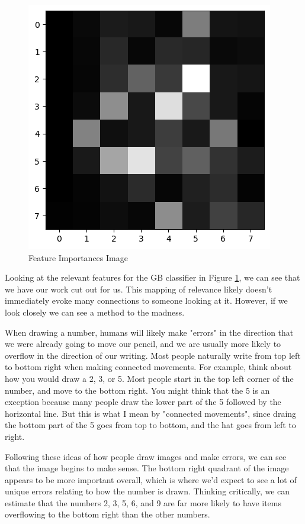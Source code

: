 \documentclass[12pt]{article}
\begin{document}
\begin{figure}
  \includegraphics[width = .75\textwidth]{../results5/Features_Digits.png}
  \caption{Feature Importances Image}
  \label{figure6}
\end{figure}

Looking at the relevant features for the GB classifier in Figure \ref{figure6}, we can see that we have our work cut out 
for us. This mapping of relevance likely doesn't immediately evoke many connections to someone looking at it. However,
if we look closely we can see a method to the madness. 

When drawing a number, humans will likely make "errors" in the direction that we were already going to move our pencil, 
and we are usually more likely to overflow in the direction of our writing. Most people naturally write from top left to 
bottom right when making connected movements. For example, think about how you would draw a 2, 3, or 5. Most people 
start in the top left corner of the number, and move to the bottom right. You might think that the 5 is an exception because 
many people draw the lower part of the 5 followed by the horizontal line. But this is what I mean by "connected movements", 
since draing the bottom part of the 5 goes from top to bottom, and the hat goes from left to right. 

Following these ideas of how people draw images and make errors, we can see that the image begins to make sense. The 
bottom right quadrant of the image appears to be more important overall, which is where we'd expect to see a lot of 
unique errors relating to how the number is drawn. Thinking critically, we can estimate that the numbers 2, 3, 5, 6, and 9 are 
far more likely to have items overflowing to the bottom right than the other numbers. 
\end{document}
